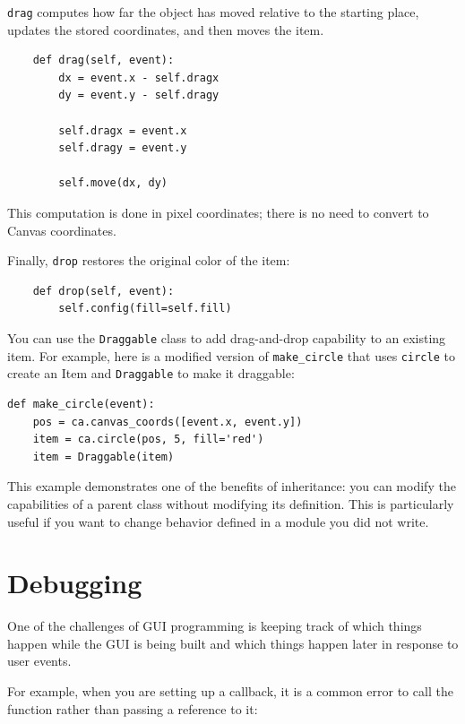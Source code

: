 \documentclass[10pt]{book}
\begin{document}
{\tt drag} computes how far the object has moved relative to the
starting place, updates the stored coordinates, and then moves the
item.


\beforeverb
\begin{verbatim}
    def drag(self, event):
        dx = event.x - self.dragx
        dy = event.y - self.dragy

        self.dragx = event.x
        self.dragy = event.y

        self.move(dx, dy)
\end{verbatim}
\afterverb
%
This computation is done in pixel coordinates; there is no need to
convert to Canvas coordinates.


Finally, {\tt drop} restores the original color of the item:

\beforeverb
\begin{verbatim}
    def drop(self, event):
        self.config(fill=self.fill)
\end{verbatim}
\afterverb
%
You can use the {\tt Draggable} class to add drag-and-drop
capability to an existing item.  For example, here is a modified
version of \verb"make_circle" that uses {\tt circle} to create
an Item and {\tt Draggable} to make it draggable:

\beforeverb
\begin{verbatim}
def make_circle(event):
    pos = ca.canvas_coords([event.x, event.y])
    item = ca.circle(pos, 5, fill='red')
    item = Draggable(item)
\end{verbatim}
\afterverb
%
This example demonstrates one of the benefits of inheritance: you can
modify the capabilities of a parent class without modifying its
definition.  This is particularly useful if you want to change
behavior defined in a module you did not write.


\section{Debugging}

One of the challenges of GUI programming is keeping track of
which things happen while the GUI is being built and which
things happen later in response to user events.


For example, when you are setting up a callback, it is a common error
to call the function rather than passing a reference to it:
\end{document}

